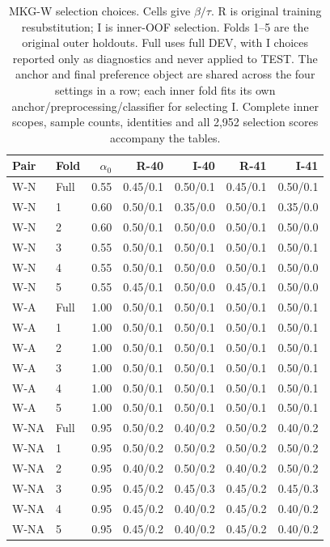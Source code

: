 \begin{table}[htbp]
\centering\footnotesize\setlength{\tabcolsep}{3pt}
\caption{MKG-W selection choices. Cells give $\beta/\tau$. R is original training resubstitution; I is inner-OOF selection. Folds 1--5 are the original outer holdouts. Full uses full DEV, with I choices reported only as diagnostics and never applied to TEST. The anchor and final preference object are shared across the four settings in a row; each inner fold fits its own anchor/preprocessing/classifier for selecting I. Complete inner scopes, sample counts, identities and all 2,952 selection scores accompany the tables.}
\label{tab:selection-choices-mkgw}
\begin{tabular}{llrrrrr}
\toprule
Pair & Fold & $\alpha_0$ & R-40 & I-40 & R-41 & I-41\\
\midrule
W-N & Full & 0.55 & 0.45/0.1 & 0.50/0.1 & 0.45/0.1 & 0.50/0.1\\
W-N & 1 & 0.60 & 0.50/0.1 & 0.35/0.0 & 0.50/0.1 & 0.35/0.0\\
W-N & 2 & 0.60 & 0.50/0.1 & 0.50/0.0 & 0.50/0.1 & 0.50/0.0\\
W-N & 3 & 0.55 & 0.50/0.1 & 0.50/0.1 & 0.50/0.1 & 0.50/0.1\\
W-N & 4 & 0.55 & 0.50/0.1 & 0.50/0.0 & 0.50/0.1 & 0.50/0.0\\
W-N & 5 & 0.55 & 0.45/0.1 & 0.50/0.0 & 0.45/0.1 & 0.50/0.0\\
W-A & Full & 1.00 & 0.50/0.1 & 0.50/0.1 & 0.50/0.1 & 0.50/0.1\\
W-A & 1 & 1.00 & 0.50/0.1 & 0.50/0.1 & 0.50/0.1 & 0.50/0.1\\
W-A & 2 & 1.00 & 0.50/0.1 & 0.50/0.1 & 0.50/0.1 & 0.50/0.1\\
W-A & 3 & 1.00 & 0.50/0.1 & 0.50/0.1 & 0.50/0.1 & 0.50/0.1\\
W-A & 4 & 1.00 & 0.50/0.1 & 0.50/0.1 & 0.50/0.1 & 0.50/0.1\\
W-A & 5 & 1.00 & 0.50/0.1 & 0.50/0.1 & 0.50/0.1 & 0.50/0.1\\
W-NA & Full & 0.95 & 0.50/0.2 & 0.40/0.2 & 0.50/0.2 & 0.40/0.2\\
W-NA & 1 & 0.95 & 0.50/0.2 & 0.50/0.2 & 0.50/0.2 & 0.50/0.2\\
W-NA & 2 & 0.95 & 0.40/0.2 & 0.50/0.2 & 0.40/0.2 & 0.50/0.2\\
W-NA & 3 & 0.95 & 0.45/0.2 & 0.45/0.3 & 0.45/0.2 & 0.45/0.3\\
W-NA & 4 & 0.95 & 0.45/0.2 & 0.40/0.2 & 0.45/0.2 & 0.40/0.2\\
W-NA & 5 & 0.95 & 0.45/0.2 & 0.40/0.2 & 0.45/0.2 & 0.40/0.2\\
\bottomrule
\end{tabular}
\end{table}
